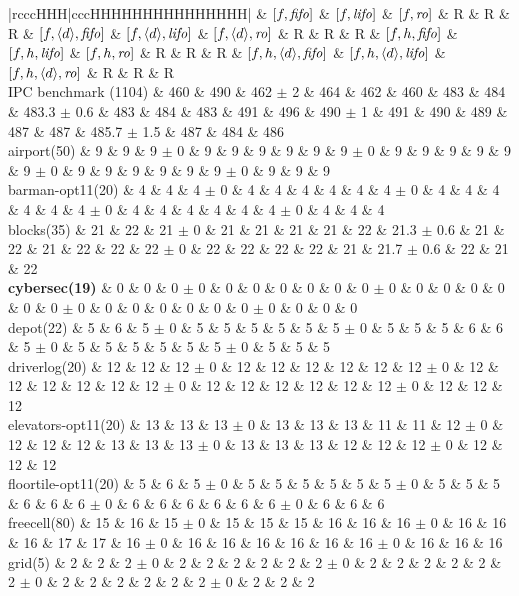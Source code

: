 \begin{center}
\begin{tabular}{|rcccHHH|cccHHHHHHHHHHHHHHH|}
\hline
 & $[f,{\text{\textit{fifo}}}]$ & $[f,{\text{\textit{lifo}}}]$ & $[f,{\text{\textit{ro}}}]$ & R & R & R & $[f,{\left<d\right>},{\text{\textit{fifo}}}]$ & $[f,{\left<d\right>},{\text{\textit{lifo}}}]$ & $[f,{\left<d\right>},{\text{\textit{ro}}}]$ & R & R & R & $[f,h,{\text{\textit{fifo}}}]$ & $[f,h,{\text{\textit{lifo}}}]$ & $[f,h,{\text{\textit{ro}}}]$ & R & R & R & $[f,h,{\left<d\right>},{\text{\textit{fifo}}}]$ & $[f,h,{\left<d\right>},{\text{\textit{lifo}}}]$ & $[f,h,{\left<d\right>},{\text{\textit{ro}}}]$ & R & R & R\\
\hline
IPC benchmark (1104) & 460 & 490 & 462 $\pm$ 2 & 464 & 462 & 460 & 483 & 484 & 483.3 $\pm$ 0.6 & 483 & 484 & 483 & 491 & 496 & 490 $\pm$ 1 & 491 & 490 & 489 & 487 & 487 & 485.7 $\pm$ 1.5 & 487 & 484 & 486\\
\hline
airport(50) & 9 & 9 & 9 $\pm$ 0 & 9 & 9 & 9 & 9 & 9 & 9 $\pm$ 0 & 9 & 9 & 9 & 9 & 9 & 9 $\pm$ 0 & 9 & 9 & 9 & 9 & 9 & 9 $\pm$ 0 & 9 & 9 & 9\\
barman-opt11(20) & 4 & 4 & 4 $\pm$ 0 & 4 & 4 & 4 & 4 & 4 & 4 $\pm$ 0 & 4 & 4 & 4 & 4 & 4 & 4 $\pm$ 0 & 4 & 4 & 4 & 4 & 4 & 4 $\pm$ 0 & 4 & 4 & 4\\
blocks(35) & 21 & 22 & 21 $\pm$ 0 & 21 & 21 & 21 & 21 & 22 & 21.3 $\pm$ 0.6 & 21 & 22 & 21 & 22 & 22 & 22 $\pm$ 0 & 22 & 22 & 22 & 22 & 21 & 21.7 $\pm$ 0.6 & 22 & 21 & 22\\
\textbf{cybersec(19)} & 0 & 0 & 0 $\pm$ 0 & 0 & 0 & 0 & 0 & 0 & 0 $\pm$ 0 & 0 & 0 & 0 & 0 & 0 & 0 $\pm$ 0 & 0 & 0 & 0 & 0 & 0 & 0 $\pm$ 0 & 0 & 0 & 0\\
depot(22) & 5 & 6 & 5 $\pm$ 0 & 5 & 5 & 5 & 5 & 5 & 5 $\pm$ 0 & 5 & 5 & 5 & 6 & 6 & 5 $\pm$ 0 & 5 & 5 & 5 & 5 & 5 & 5 $\pm$ 0 & 5 & 5 & 5\\
driverlog(20) & 12 & 12 & 12 $\pm$ 0 & 12 & 12 & 12 & 12 & 12 & 12 $\pm$ 0 & 12 & 12 & 12 & 12 & 12 & 12 $\pm$ 0 & 12 & 12 & 12 & 12 & 12 & 12 $\pm$ 0 & 12 & 12 & 12\\
elevators-opt11(20) & 13 & 13 & 13 $\pm$ 0 & 13 & 13 & 13 & 11 & 11 & 12 $\pm$ 0 & 12 & 12 & 12 & 13 & 13 & 13 $\pm$ 0 & 13 & 13 & 13 & 12 & 12 & 12 $\pm$ 0 & 12 & 12 & 12\\
floortile-opt11(20) & 5 & 6 & 5 $\pm$ 0 & 5 & 5 & 5 & 5 & 5 & 5 $\pm$ 0 & 5 & 5 & 5 & 6 & 6 & 6 $\pm$ 0 & 6 & 6 & 6 & 6 & 6 & 6 $\pm$ 0 & 6 & 6 & 6\\
freecell(80) & 15 & 16 & 15 $\pm$ 0 & 15 & 15 & 15 & 16 & 16 & 16 $\pm$ 0 & 16 & 16 & 16 & 17 & 17 & 16 $\pm$ 0 & 16 & 16 & 16 & 16 & 16 & 16 $\pm$ 0 & 16 & 16 & 16\\
grid(5) & 2 & 2 & 2 $\pm$ 0 & 2 & 2 & 2 & 2 & 2 & 2 $\pm$ 0 & 2 & 2 & 2 & 2 & 2 & 2 $\pm$ 0 & 2 & 2 & 2 & 2 & 2 & 2 $\pm$ 0 & 2 & 2 & 2\\

\end{tabular}
\end{center}
